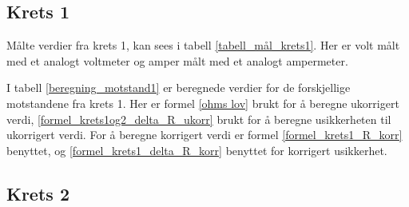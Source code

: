 \documentclass[twocolumn, a4paper, 11pt]{article} %
\begin{document}
\subsection{Krets 1}

Målte verdier fra krets 1, kan sees i tabell \ref{tabell_mål_krets1}. Her er volt målt med et analogt voltmeter og amper målt med et analogt ampermeter.

\begin{table}[H]
\centering
\caption{Krets 1.}
\label{tabell_mål_krets1}
\end{table}

I tabell \ref{beregning_motstand1} er beregnede verdier for de forskjellige motstandene fra krets 1. Her er formel \eqref{ohms lov} brukt for å beregne ukorrigert verdi, \eqref{formel_krets1og2_delta_R_ukorr} brukt for å beregne usikkerheten til  ukorrigert verdi. For å beregne korrigert verdi er formel \eqref{formel_krets1_R_korr} benyttet, og \eqref{formel_krets1_delta_R_korr} benyttet for korrigert usikkerhet.

\begin{table}[H]
\centering
\caption{Krets 1 motstand beregning.}
\label{beregning_motstand1}
\end{table}

\subsection{Krets 2}
\end{document}
